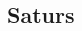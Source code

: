 \renewcommand{\contentsname}{}
\renewcommand{\cftsecfont}{}
\renewcommand{\cftsecpagefont}{}
\renewcommand{\cftsecleader}{\cftdotfill{\cftdotsep}}
\setlength{\cftbeforesecskip}{0pt}
\setlength{\cftbeforetoctitleskip}{0pt}
\setlength{\cftaftertoctitleskip}{0pt}
\begin{spacing}{1.25}
    \section*{Saturs}
    \tableofcontents
\end{spacing}
